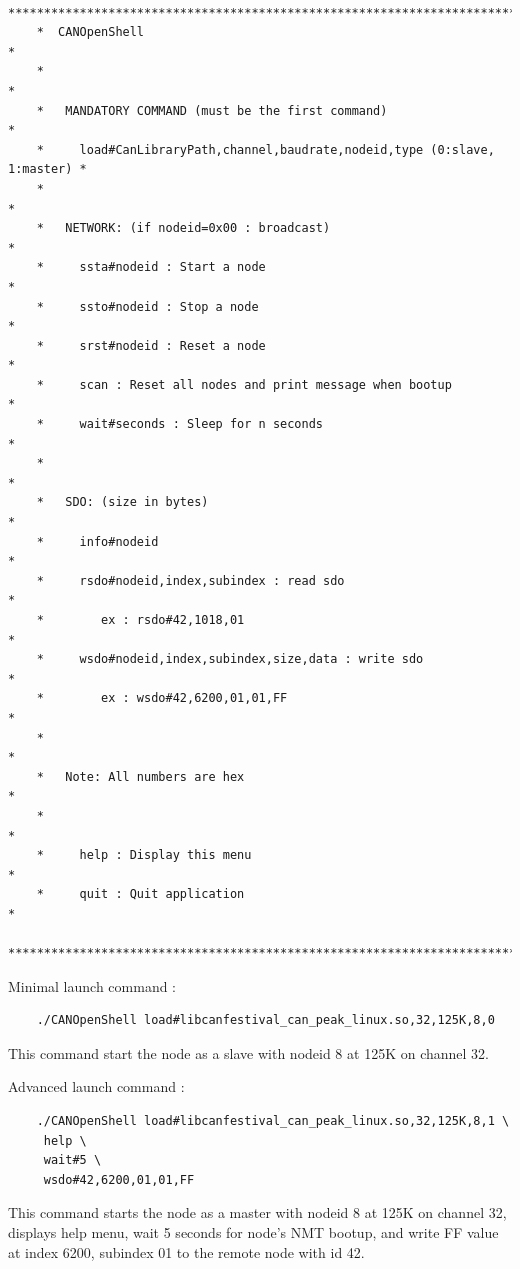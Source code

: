 \documentclass[12pt,english,a4paper]{book}
\begin{document}
\begin{verbatim}
	****************************************************************************
	*  CANOpenShell                                                            *
	*                                                                          *
  	*   MANDATORY COMMAND (must be the first command)                          *
	*     load#CanLibraryPath,channel,baudrate,nodeid,type (0:slave, 1:master) *
	*                                                                          *
	*   NETWORK: (if nodeid=0x00 : broadcast)                                  *
	*     ssta#nodeid : Start a node                                           *
	*     ssto#nodeid : Stop a node                                            *
	*     srst#nodeid : Reset a node                                           *
	*     scan : Reset all nodes and print message when bootup                 *
	*     wait#seconds : Sleep for n seconds                                   *
	*                                                                          *
	*   SDO: (size in bytes)                                                   *
	*     info#nodeid                                                          *
	*     rsdo#nodeid,index,subindex : read sdo                                *
	*        ex : rsdo#42,1018,01                                              *
	*     wsdo#nodeid,index,subindex,size,data : write sdo                     *
	*        ex : wsdo#42,6200,01,01,FF                                        *
	*                                                                          *
	*   Note: All numbers are hex                                              *
	*                                                                          *
	*     help : Display this menu                                             *
	*     quit : Quit application                                              *
	****************************************************************************
\end{verbatim}

Minimal launch command :
\begin{verbatim}
	./CANOpenShell load#libcanfestival_can_peak_linux.so,32,125K,8,0
\end{verbatim}
This command start the node as a slave with nodeid 8 at 125K on channel 32.

Advanced launch command :
\begin{verbatim}
	./CANOpenShell load#libcanfestival_can_peak_linux.so,32,125K,8,1 \
	 help \
	 wait#5 \
	 wsdo#42,6200,01,01,FF
\end{verbatim}
This command starts the node as a master with nodeid 8 at 125K on channel 32, 
displays help menu, wait 5 seconds for node's NMT bootup, 
and write FF value at index 6200, subindex 01 to the remote node with id 42.
\end{document}
